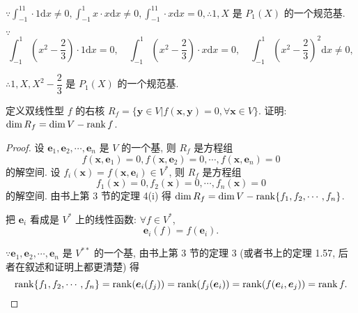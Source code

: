 \documentclass[color=black,device=normal,lang=cn,mode=geye]{elegantnote}
\begin{document}
\begin{solution}
    $\because\int_{-1}^11\cdot 1\mathrm{d}x\neq0,\int_{-1}^1x\cdot x\mathrm{d}x\neq0,\int_{-1}^11\cdot x\mathrm{d}x=0,\therefore1,X$ 是 $P_1(X)$ 的一个规范基.

    $\because$
    \[\int_{-1}^1\left(x^2-\dfrac{2}{3}\right)\cdot 1\mathrm{d}x=0,\quad\int_{-1}^1\left(x^2-\dfrac{2}{3}\right)\cdot x\mathrm{d}x=0,\quad\int_{-1}^1\left(x^2-\dfrac{2}{3}\right)^2\mathrm{d}x\neq0,\]

    $\therefore1,X,X^2-\dfrac{2}{3}$ 是 $P_1(X)$ 的一个规范基.
\end{solution}
\begin{exercisec}[1.72(1)]
    定义双线性型 $f$ 的右核 $R_f=\{\boldsymbol{y}\in V|f(\boldsymbol{x},\boldsymbol{y})=0,\forall\boldsymbol{x}\in V\}$. 证明: $\dim R_f=\dim V-\operatorname{rank} f$.
\end{exercisec}
\begin{proof}
    设 $\boldsymbol{e}_1,\boldsymbol{e}_2,\cdots,\boldsymbol{e}_n$ 是 $V$ 的一个基, 则 $R_f$ 是方程组
    \[f(\boldsymbol{x},\boldsymbol{e}_1)=0,f(\boldsymbol{x},\boldsymbol{e}_2)=0,\cdots,f(\boldsymbol{x},\boldsymbol{e}_n)=0\]
    的解空间. 设 $f_i(\boldsymbol{x})=f(\boldsymbol{x},\boldsymbol{e}_i)\in V^*$, 则 $R_f$ 是方程组
    \[f_1(\boldsymbol{x})=0,f_2(\boldsymbol{x})=0,\cdots,f_n(\boldsymbol{x})=0\]
    的解空间. 由书上第 3 节的定理 4(i) 得 $\dim R_f=\dim V-\operatorname{rank}\{f_1,f_2,\cdots,f_n\}$.

    把 $\boldsymbol{e}_i$ 看成是 $V^*$ 上的线性函数: $\forall f\in V^*$,
    \[\boldsymbol{e}_i(f)=f(\boldsymbol{e}_i).\]

    $\because\boldsymbol{e}_1,\boldsymbol{e}_2,\cdots,\boldsymbol{e}_n$ 是 $V^{**}$ 的一个基, 由书上第 3 节的定理 3 (或者书上的定理 1.57, 后者在叙述和证明上都更清楚) 得
    \[\operatorname{rank}\{f_1,f_2,\cdots,f_n\}=\operatorname{rank}(\boldsymbol{e}_i(f_j))=\operatorname{rank}(f_j(\boldsymbol{e}_i))=\operatorname{rank}(f(\boldsymbol{e}_i,\boldsymbol{e}_j))=\operatorname{rank} f.\qedhere\]
\end{proof}
\end{document}
